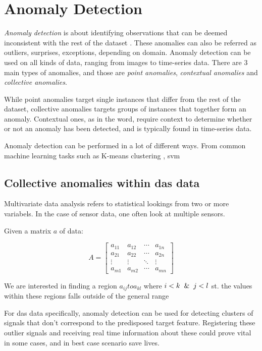 \section{Anomaly Detection}
\label{back:anomdet}

\textit{Anomaly detection} is about identifying observations that can be deemed inconsistent with the rest of the dataset \cite{anomaly}. These anomalies can also be referred as outliers, surprises, exceptions, depending on domain. Anomaly detection can be used on all kinds of data, ranging from images to time-series data. There are 3 main types of anomalies, and those are \textit{point anomalies}, \textit{contextual anomalies} and \textit{collective anomalies}.

While point anomalies target single instances that differ from the rest of the dataset, collective anomalies targets groups of instances that together form an anomaly. Contextual ones, as in the word, require context to determine whether or not an anomaly has been detected, and is typically found in time-series data.

Anomaly detection can be performed in a lot of different ways. From common machine learning tasks such as K-means clustering \cite{7507933}, \Gls{svm} \cite{10.1007/978-3-540-28647-9_97}

\subsection{Collective anomalies within \acrshort{das} data}

Multivariate data analysis refers to statistical lookings from two or more variabels. In the case of sensor data, one often look at multiple sensors. 

Given a matrix $a$ of data:

\[
A = \begin{bmatrix}
a_{11} & a_{12} & \cdots & a_{1n} \\
a_{21} & a_{22} & \cdots & a_{2n} \\
\vdots & \vdots & \ddots & \vdots \\
a_{m1} & a_{m2} & \cdots & a_{mn}
\end{bmatrix}
\]

We are interested in finding a region $a_{ij} to a_{kl}$ where $i < k \And j < l$ st. the values within these regions falls outside of the general range


For \acrshort{das} data specifically, anomaly detection can be used for detecting clusters of signals that don't correspond to the predisposed target feature. Registering these outlier signals and receiving real time information about these could prove vital in some cases,  and in best case scenario save lives. 

